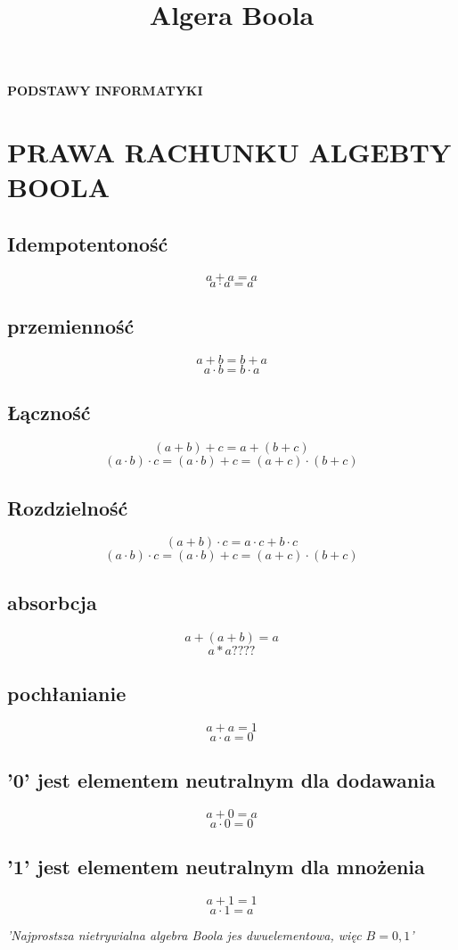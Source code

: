 \documentclass{article}
\title{Algera Boola}
\begin{document}
\begin{titlepage}
    \begin{center}
        \vspace*{1cm}
        
        \Huge

        \textbf{PODSTAWY INFORMATYKI}
        
        \vspace{3cm}
    \end{center}
\end{titlepage}
\newpage
\section{PRAWA RACHUNKU ALGEBTY BOOLA}
\subsection{Idempotentoność}
\[a + a = a\]
\[a \cdot a = a\]
\subsection{przemienność}
\[a + b = b + a\]
\[a \cdot b = b \cdot a\]
\subsection{Łączność}
\[(a + b) + c = a + (b + c)\]
\[(a \cdot b) \cdot c = (a \cdot b) + c = (a + c) \cdot (b + c)\]
\subsection{Rozdzielność}
\[(a + b) \cdot c = a \cdot c + b \cdot c\]
\[(a \cdot b) \cdot c = (a \cdot b) + c = (a + c) \cdot (b + c)\]
\subsection{absorbcja}
\[a + (a + b) = a\]
\[a * a ????\]
\subsection{pochłanianie}
\[a + a = 1\]
\[a \cdot a = 0\]
\subsection{'0' jest elementem neutralnym dla dodawania}
\[a + 0 = a\]
\[a \cdot 0 = 0\]
\subsection{'1' jest elementem neutralnym dla mnożenia}
\[a + 1 = 1\]
\[a \cdot 1 = a\]
\begin{center}
    \textit{'Najprostsza nietrywialna algebra Boola jes dwuelementowa, więc $B = {0,1}$'}
\end{center}
\end{document}
